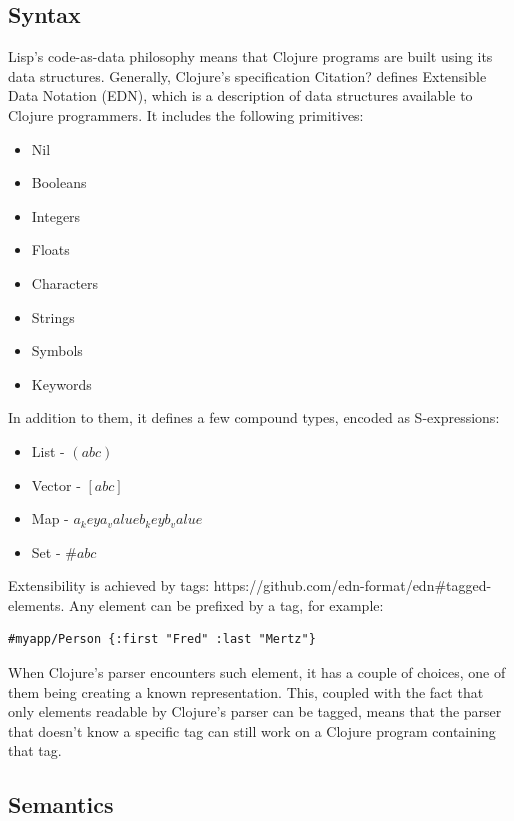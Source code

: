 \documentclass[11pt]{scrartcl}
\begin{document}
\subsection{Syntax}
Lisp’s code-as-data philosophy means that Clojure programs are built using its data structures. Generally, Clojure’s specification {Citation?} defines Extensible Data Notation (EDN), which is a description of data structures available to Clojure programmers. It includes the following primitives:
\begin{itemize}
  \item Nil
  \item Booleans
  \item Integers
  \item Floats
  \item Characters
  \item Strings
  \item Symbols
  \item Keywords
\end{itemize}
In addition to them, it defines a few compound types, encoded as S-expressions:
\begin{itemize}
  \item List - $(a b c) $
  \item Vector - $[a b c]$
  \item Map - ${a_key a_value b_key b_value}$
  \item Set - $\#{a b c}$
\end{itemize}
Extensibility is achieved by tags:  {https://github.com/edn-format/edn\#tagged-elements}. Any element can be prefixed by a tag, for example:
\begin{lstlisting}
#myapp/Person {:first "Fred" :last "Mertz"} 
\end{lstlisting}
When Clojure’s parser encounters such element, it has a couple of choices, one of them being creating a known representation. This, coupled with the fact that only elements readable by Clojure’s parser can be tagged, means that the parser that doesn’t know a specific tag can still work on a Clojure program containing that tag.

\subsection{Semantics}
\end{document}
